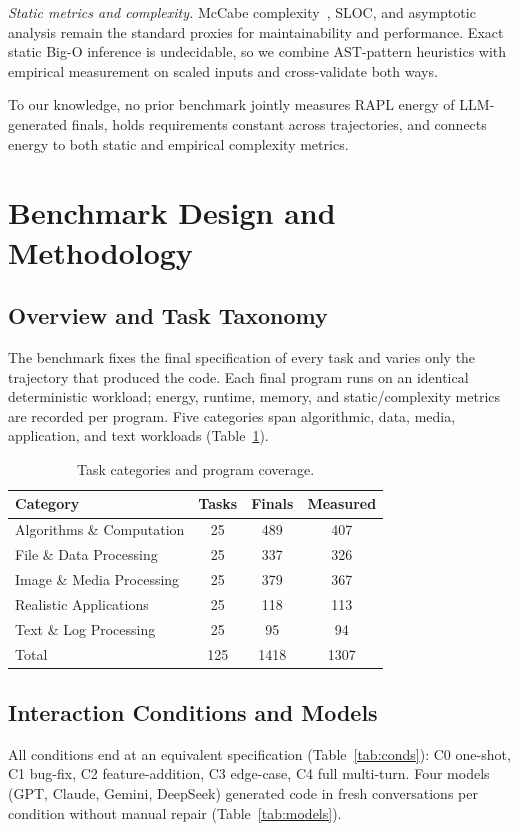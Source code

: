 \documentclass[conference]{IEEEtran}
\begin{document}
\emph{Static metrics and complexity.}
McCabe complexity~\cite{mccabe1976}, SLOC, and asymptotic analysis remain the
standard proxies for maintainability and performance. Exact static Big-O
inference is undecidable, so we combine AST-pattern heuristics with empirical
measurement on scaled inputs and cross-validate both ways.

To our knowledge, no prior benchmark jointly measures RAPL energy of
LLM-generated finals, holds requirements constant across trajectories, and
connects energy to both static and empirical complexity metrics.

\section{Benchmark Design and Methodology}
\subsection{Overview and Task Taxonomy}
The benchmark fixes the final specification of every task and varies only
the trajectory that produced the code. Each final program runs on an
identical deterministic workload; energy, runtime, memory, and
static/complexity metrics are recorded per program. Five categories span
algorithmic, data, media, application, and text workloads
(Table~\ref{tab:coverage}).

\begin{table}[htbp]
\caption{Task categories and program coverage.}
\label{tab:coverage}
\centering
\begin{tabular}{lccc}
\toprule
Category & Tasks & Finals & Measured \\
\midrule
Algorithms \& Computation & 25 & 489 & 407 \\
File \& Data Processing & 25 & 337 & 326 \\
Image \& Media Processing & 25 & 379 & 367 \\
Realistic Applications & 25 & 118 & 113 \\
Text \& Log Processing & 25 & 95 & 94 \\
\midrule
Total & 125 & 1418 & 1307 \\
\bottomrule
\end{tabular}
\end{table}

\subsection{Interaction Conditions and Models}
All conditions end at an equivalent specification
(Table~\ref{tab:conds}): C0 one-shot, C1 bug-fix, C2 feature-addition, C3
edge-case, C4 full multi-turn. Four models (GPT, Claude, Gemini, DeepSeek)
generated code in fresh conversations per condition without manual repair
(Table~\ref{tab:models}).
\end{document}
